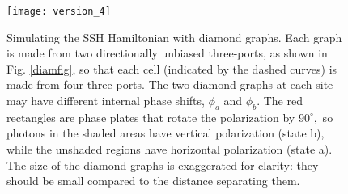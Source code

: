 \documentclass[twocolumn,amsmath, amssymb, superscriptaddress, pra]{revtex4}
\begin{document}
%

\begin{figure}%
\centering
\texttt{[image: version\_4]}
\caption{Simulating the SSH Hamiltonian with diamond graphs. Each graph is made from two directionally unbiased three-ports, as shown in Fig. \ref{diamfig},
so that each cell (indicated by the dashed curves) is made from four three-ports.
The two diamond graphs at each site may have different internal phase shifts, $\phi_a$ and $\phi_b$.
The red rectangles are phase plates that rotate the polarization by $90^\circ,$ so photons in the shaded areas have vertical polarization (state b),
while the unshaded regions have horizontal polarization (state a).  The size of the
diamond graphs is exaggerated for clarity: they should be small compared to the distance separating them.}
\label{sshv4fig}
\end{figure}

\end{document}
